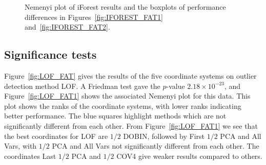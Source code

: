 \documentclass[letter,12pt]{article}
\begin{document}
\begin{figure}[!p]
  \centering
  \hfill
  \caption{Nemenyi plot of iForest results and the boxplots of performance differences in Figures~\ref{fig:IFOREST_FAT1} and~\ref{fig:IFOREST_FAT2}.}
  \label{fig:IFOREST_FAT}
\end{figure}

\subsection{Significance tests}\label{sec:DatRepo1}

Figure~\ref{fig:LOF_FAT} gives the results of the {\color{blue} five } coordinate systems on outlier detection method LOF. A Friedman test gave the $p$-value $ 2.18 \times 10^{-23}$, and Figure~\ref{fig:LOF_FAT1} shows the associated Nemenyi plot for this data. This plot shows the ranks of the coordinate systems, with lower ranks indicating better performance. The blue squares highlight methods which are not significantly different from each other. From Figure~\ref{fig:LOF_FAT1} we see that the best coordinates for LOF are $1/2$ DOBIN, followed by First $1/2$ PCA and All Vars, with $1/2$ PCA and All Vars not significantly different from each other. {\color{blue} The coordinates Last $1/2$ PCA and $1/2$ COV4 give weaker results compared to others.  }
\end{document}
